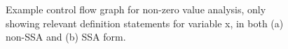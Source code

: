 \begin{figure}
\begin{center}
%
\end{center}
\caption{Example control flow graph for
  non-zero value analysis, only showing relevant definition statements for
  variable x, in both (a) non-SSA and (b) SSA form.}
\label{fig:part1-vanilla-cfgexample}
\end{figure}


